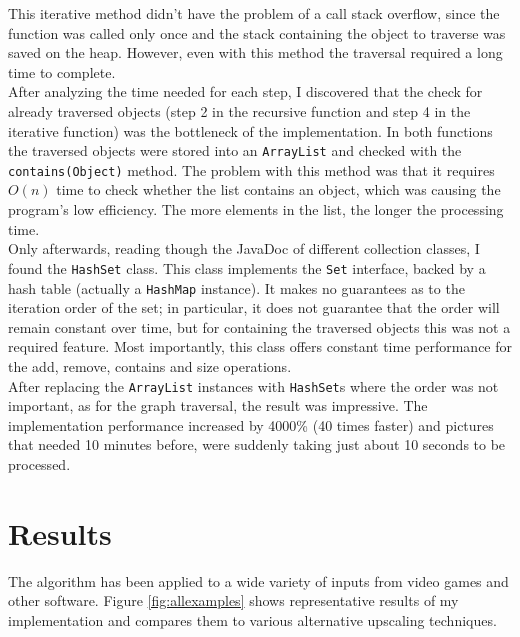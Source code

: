 \documentclass[]{usiinfbachelorproject}
\begin{document}
This iterative method didn't have the problem of a call stack overflow, since the function was called only once and the stack containing the object to traverse was saved on the heap. However, even with this method the traversal required a long time to complete.\\

\noindent After analyzing the time needed for each step, I discovered that the check for already traversed objects (step 2 in the recursive function and step 4 in the iterative function) was the bottleneck of the implementation. In both functions the traversed objects were stored into an {\tt ArrayList} and checked with the {\tt contains(Object)} method. The problem with this method was that it requires $O(n)$ time to check whether the list contains an object, which was causing the program's low efficiency. The more elements in the list, the longer the processing time.\\

\noindent Only afterwards, reading though the JavaDoc of different collection classes, I found the {\tt HashSet} class.
This class implements the {\tt Set} interface, backed by a hash table (actually a {\tt HashMap} instance). It makes no guarantees as to the iteration order of the set; in particular, it does not guarantee that the order will remain constant over time, but for containing the traversed objects this was not a required feature. Most importantly, this class offers constant time performance for the add, remove, contains and size operations.\\
After replacing the {\tt ArrayList} instances with {\tt HashSet}s where the order was not important, as for the graph traversal, the result was impressive. The implementation performance increased by 4000\% (40 times faster) and pictures that needed 10 minutes before, were suddenly taking just about 10 seconds to be processed.

\section{Results}

The algorithm has been applied to a wide variety of inputs from video games and other software. Figure \ref{fig:allexamples} shows representative results of my implementation and compares them to various alternative upscaling techniques.
\end{document}
